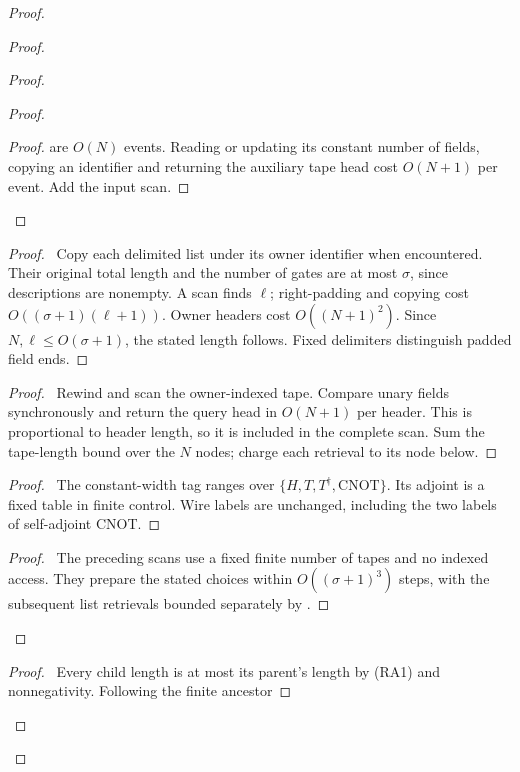 \begin{proof}
\begin{proof}
\begin{proof}
\begin{proof}
\begin{proof}
  are $O(N)$ events. Reading or updating its constant number of
  fields, copying an identifier and returning the auxiliary tape
  head cost $O(N+1)$ per event. Add the input scan.\end{proof}
 \end{proof}
 \begin{proof}\pf\ Copy each delimited list under its owner
 identifier when encountered. Their original total length and the
 number of gates are at most $\sigma$, since descriptions are
 nonempty. A scan finds $\ell$; right-padding and copying cost
 $O((\sigma+1)(\ell+1))$. Owner headers cost $O((N+1)^2)$.
 Since $N,\ell\leq O(\sigma+1)$, the stated length follows.
 Fixed delimiters distinguish padded field ends.\end{proof}
 \begin{proof}\pf\ Rewind and scan the owner-indexed tape.
 Compare unary fields synchronously and return the query head in
 $O(N+1)$ per header. This is proportional to header length, so
 it is included in the complete scan. Sum the tape-length bound
 over the $N$ nodes; charge each retrieval to its node below.\end{proof}
 \begin{proof}\pf\ The constant-width tag ranges over
 $\{H,T,T^\dagger,\mathrm{CNOT}\}$. Its adjoint is a fixed table
 in finite control. Wire labels are unchanged, including the two
 labels of self-adjoint CNOT.\end{proof}
 \qedstep
 \begin{proof}\pf\ The preceding scans use a fixed finite number
 of tapes and no indexed access. They prepare the stated choices
 within $O((\sigma+1)^3)$ steps, with the subsequent list retrievals
 bounded separately by .\end{proof}
\end{proof}
  \begin{proof}\pf\ Every child length is at most its parent's
  length by (RA1) and nonnegativity. Following the finite ancestor

\end{proof}
\end{proof}
\end{proof}
